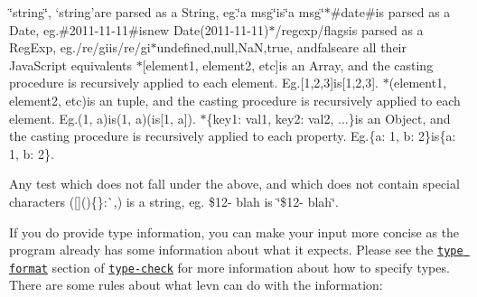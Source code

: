 \begin{DoxyItemize}
\item {\ttfamily \char`\"{}string\char`\"{}}, `\textquotesingle{}string'{\ttfamily are parsed as a String, eg.}\char`\"{}a msg\char`\"{}{\ttfamily is}\char`\"{}a msg\char`\"{}{\ttfamily  $\ast$}\#date\#{\ttfamily is parsed as a Date, eg.}\#2011-\/11-\/11\#{\ttfamily is}new Date(\textquotesingle{}2011-\/11-\/11\textquotesingle{}){\ttfamily  $\ast$}/regexp/flags{\ttfamily is parsed as a Reg\+Exp, eg.}/re/gi{\ttfamily is}/re/gi{\ttfamily  $\ast$}undefined{\ttfamily ,}null{\ttfamily ,}NaN{\ttfamily ,}true{\ttfamily , and}false{\ttfamily are all their Java\+Script equivalents $\ast$}\mbox{[}element1, element2, etc\mbox{]}{\ttfamily is an Array, and the casting procedure is recursively applied to each element. Eg.}\mbox{[}1,2,3\mbox{]}{\ttfamily is}\mbox{[}1,2,3\mbox{]}{\ttfamily . $\ast$}(element1, element2, etc){\ttfamily is an tuple, and the casting procedure is recursively applied to each element. Eg.}(1, a){\ttfamily is}(1, a){\ttfamily (is}\mbox{[}1, \textquotesingle{}a\textquotesingle{}\mbox{]}{\ttfamily ). $\ast$}\{key1\+: val1, key2\+: val2, ...\}{\ttfamily is an Object, and the casting procedure is recursively applied to each property. Eg.}\{a\+: 1, b\+: 2\}{\ttfamily is}\{a\+: 1, b\+: 2\}{\ttfamily .}
\item {\ttfamily Any test which does not fall under the above, and which does not contain special characters (}\mbox{[}{\ttfamily \mbox{]}}({\ttfamily )}\{{\ttfamily \}}\+:\`{}{\ttfamily ,}) is a string, eg. {\ttfamily \$12-\/ blah} is {\ttfamily \char`\"{}\$12-\/ blah\char`\"{}}.
\end{DoxyItemize}

If you do provide type information, you can make your input more concise as the program already has some information about what it expects. Please see the \href{https://github.com/gkz/type-check#type-format}{\tt type format} section of \href{https://github.com/gkz/type-check}{\tt type-\/check} for more information about how to specify types. There are some rules about what levn can do with the information\+:


